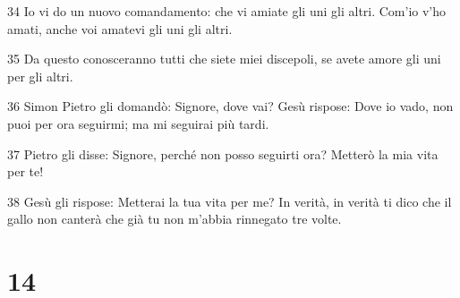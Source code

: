 \par 34 Io vi do un nuovo comandamento: che vi amiate gli uni gli altri. Com'io v'ho amati, anche voi amatevi gli uni gli altri.
\par 35 Da questo conosceranno tutti che siete miei discepoli, se avete amore gli uni per gli altri.
\par 36 Simon Pietro gli domandò: Signore, dove vai? Gesù rispose: Dove io vado, non puoi per ora seguirmi; ma mi seguirai più tardi.
\par 37 Pietro gli disse: Signore, perché non posso seguirti ora? Metterò la mia vita per te!
\par 38 Gesù gli rispose: Metterai la tua vita per me? In verità, in verità ti dico che il gallo non canterà che già tu non m'abbia rinnegato tre volte.

\chapter{14}

